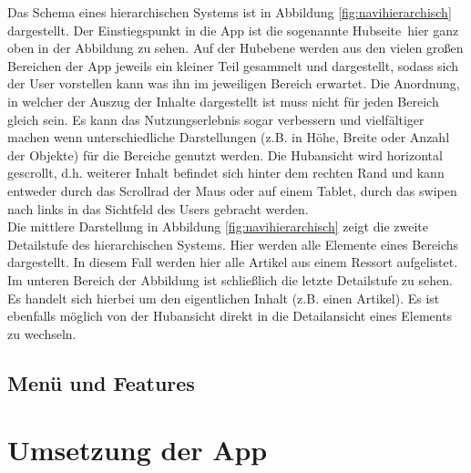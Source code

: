 \documentclass[12pt,a4paper]{scrartcl}
\begin{document}
Das Schema eines hierarchischen Systems ist in Abbildung \ref{fig:navihierarchisch} dargestellt. Der Einstiegspunkt in die App ist die sogenannte \glqq Hubseite\grqq\, hier ganz oben in der Abbildung zu sehen. Auf der Hubebene werden aus den vielen großen Bereichen der App jeweils ein kleiner Teil gesammelt und dargestellt, sodass sich der User vorstellen kann was ihn im jeweiligen Bereich erwartet. Die Anordnung, in welcher der Auszug der Inhalte dargestellt ist muss nicht für jeden Bereich gleich sein. Es kann das Nutzungserlebnis sogar verbessern und vielfältiger machen wenn unterschiedliche Darstellungen (z.B. in Höhe, Breite oder Anzahl der Objekte) für die Bereiche genutzt werden. Die Hubansicht wird horizontal gescrollt, d.h. weiterer Inhalt befindet sich hinter dem rechten Rand und kann entweder durch das Scrollrad der Maus oder auf einem Tablet, durch das swipen nach links in das Sichtfeld des Users gebracht werden.\\
Die mittlere Darstellung in Abbildung \ref{fig:navihierarchisch} zeigt die zweite Detailstufe des hierarchischen Systems. Hier werden alle Elemente eines Bereichs dargestellt. In diesem Fall werden hier alle Artikel aus einem Ressort aufgelistet.\\
Im unteren Bereich der Abbildung ist schließlich die letzte Detailstufe zu sehen. Es handelt sich hierbei um den eigentlichen Inhalt (z.B. einen Artikel). Es ist ebenfalls möglich von der Hubansicht direkt in die Detailansicht eines Elements zu wechseln.    

\subsection{Menü und Features}
\label{subsec:menuandproperties}

\newpage
\section{Umsetzung der App}
\label{sec:umsetzungderapp}
\end{document}

